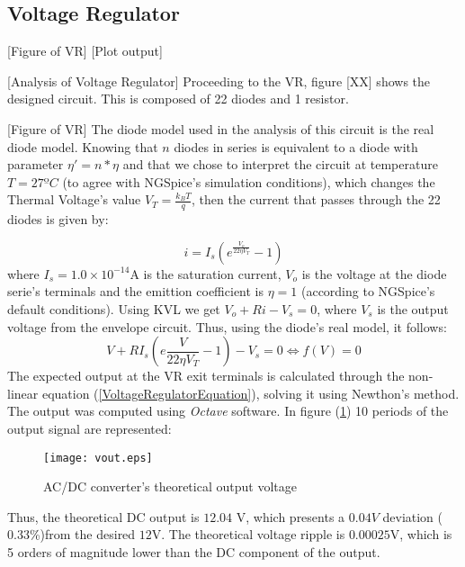 \subsection{Voltage Regulator}
[Figure of VR]
[Plot output]

[Analysis of Voltage Regulator]
Proceeding to the VR, figure [XX] shows the designed circuit. This is composed of 22 diodes and 1 resistor.

[Figure of VR]
The diode model used in the analysis of this circuit is the real diode model. Knowing that $n$ diodes in series is equivalent to a diode with parameter $\eta'=n*\eta$ and that we chose to
interpret the circuit at temperature $T=27ºC$ (to agree with NGSpice's simulation conditions), which changes the Thermal Voltage's value $V_T=\frac{k_BT}{q}$, then the current that passes through the 22 diodes is given by:

\begin{equation}
i=I_s(e^{\frac{V_o}{22 \eta V_T}}-1)
\end{equation}
where $I_s=1.0\times 10^{-14}$A is the saturation current, $V_o$ is the voltage at the diode serie's terminals and the emittion coefficient is $\eta=1$ (according to NGSpice's default conditions).
Using KVL we get $V_o+Ri-V_s=0$, where $V_s$ is the output voltage from the envelope circuit. Thus, using the diode's real model, it follows:
\begin{equation}
  V+RI_s(e{\frac{V}{22 \eta V_T}}-1)-V_s=0 \Leftrightarrow f(V)=0
  \label{VoltageRegulatorEquation}
\end{equation}
The expected output at the VR exit terminals is calculated through the non-linear equation (\ref{VoltageRegulatorEquation}), solving it using Newthon's method.
The output was computed using \textit{Octave} software. In figure (\ref{fig:VoltageRegulatorOutput}) 10 periods of the output signal are represented:

 \begin{figure}[H]
   \centering
   \texttt{[image: vout.eps]}
   \caption{AC/DC converter's theoretical output voltage}
   \label{fig:VoltageRegulatorOutput}
 \end{figure}


Thus, the theoretical DC output is $12.04$ V, which presents a $0.04V$ deviation ($0.33$\%)from the desired $12$V. The theoretical voltage ripple is $0.00025$V, which is 5 orders of magnitude lower than the DC component of the output.
